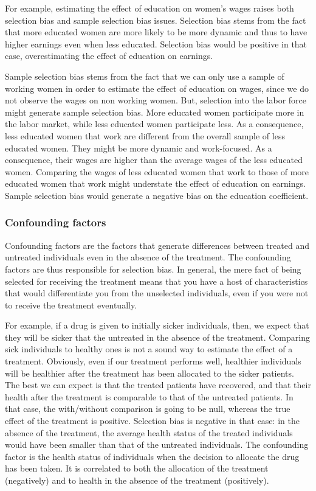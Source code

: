 \documentclass[]{book}
\theoremstyle{definition}
\theoremstyle{definition}
\theoremstyle{definition}
\theoremstyle{remark}
\begin{document}
For example, estimating the effect of education on women's wages raises
both selection bias and sample selection bias issues. Selection bias
stems from the fact that more educated women are more likely to be more
dynamic and thus to have higher earnings even when less educated.
Selection bias would be positive in that case, overestimating the effect
of education on earnings.

Sample selection bias stems from the fact that we can only use a sample
of working women in order to estimate the effect of education on wages,
since we do not observe the wages on non working women. But, selection
into the labor force might generate sample selection bias. More educated
women participate more in the labor market, while less educated women
participate less. As a consequence, less educated women that work are
different from the overall sample of less educated women. They might be
more dynamic and work-focused. As a consequence, their wages are higher
than the average wages of the less educated women. Comparing the wages
of less educated women that work to those of more educated women that
work might understate the effect of education on earnings. Sample
selection bias would generate a negative bias on the education
coefficient.

\subsubsection{Confounding factors}\label{confounding-factors}

Confounding factors are the factors that generate differences between
treated and untreated individuals even in the absence of the treatment.
The confounding factors are thus responsible for selection bias. In
general, the mere fact of being selected for receiving the treatment
means that you have a host of characteristics that would differentiate
you from the unselected individuals, even if you were not to receive the
treatment eventually.

For example, if a drug is given to initially sicker individuals, then,
we expect that they will be sicker that the untreated in the absence of
the treatment. Comparing sick individuals to healthy ones is not a sound
way to estimate the effect of a treatment. Obviously, even if our
treatment performs well, healthier individuals will be healthier after
the treatment has been allocated to the sicker patients. The best we can
expect is that the treated patients have recovered, and that their
health after the treatment is comparable to that of the untreated
patients. In that case, the with/without comparison is going to be null,
whereas the true effect of the treatment is positive. Selection bias is
negative in that case: in the absence of the treatment, the average
health status of the treated individuals would have been smaller than
that of the untreated individuals. The confounding factor is the health
status of individuals when the decision to allocate the drug has been
taken. It is correlated to both the allocation of the treatment
(negatively) and to health in the absence of the treatment (positively).
\end{document}
